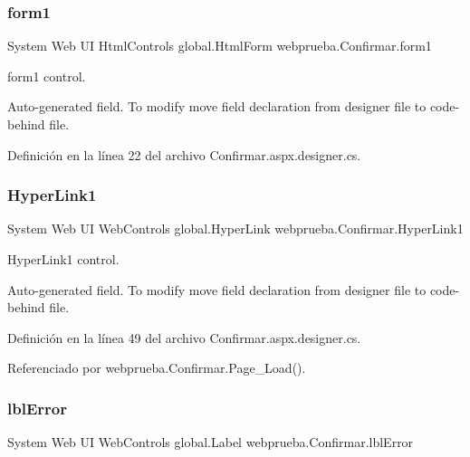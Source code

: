 \subsubsection{\texorpdfstring{form1}{form1}}
{\footnotesize\ttfamily System Web UI Html\+Controls global.\+Html\+Form webprueba.\+Confirmar.\+form1\hspace{0.3cm}{\ttfamily [protected]}}



form1 control. 

Auto-\/generated field. To modify move field declaration from designer file to code-\/behind file. 

Definición en la línea 22 del archivo Confirmar.\+aspx.\+designer.\+cs.

\mbox{\label{classwebprueba_1_1_confirmar_a36dc790fef42876a20f279fac79ec0db}} 
\subsubsection{\texorpdfstring{HyperLink1}{HyperLink1}}
{\footnotesize\ttfamily System Web UI Web\+Controls global.\+Hyper\+Link webprueba.\+Confirmar.\+Hyper\+Link1\hspace{0.3cm}{\ttfamily [protected]}}



Hyper\+Link1 control. 

Auto-\/generated field. To modify move field declaration from designer file to code-\/behind file. 

Definición en la línea 49 del archivo Confirmar.\+aspx.\+designer.\+cs.



Referenciado por webprueba.\+Confirmar.\+Page\+\_\+\+Load().

\mbox{\label{classwebprueba_1_1_confirmar_a356770e3d6653a1bfc13c855989a858b}} 
\subsubsection{\texorpdfstring{lblError}{lblError}}
{\footnotesize\ttfamily System Web UI Web\+Controls global.\+Label webprueba.\+Confirmar.\+lbl\+Error\hspace{0.3cm}{\ttfamily [protected]}}



